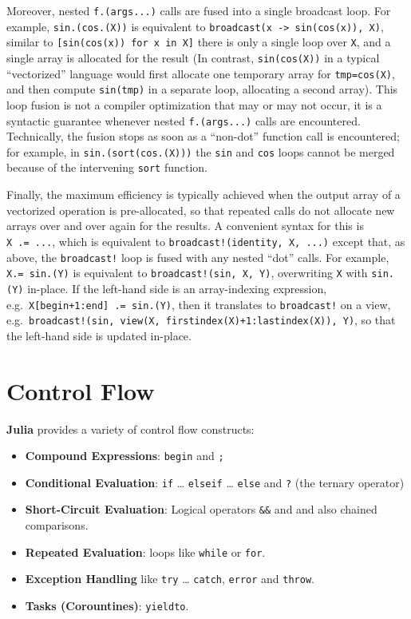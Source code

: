 \documentclass[
]{article}
\providecommand{\tightlist}{%
  \setlength{\itemsep}{0pt}\setlength{\parskip}{0pt}}
\begin{document}
Moreover, nested \texttt{f.(args...)} calls are fused into a single
broadcast loop. For example, \texttt{sin.(cos.(X))} is equivalent to
\texttt{broadcast(x\ -\textgreater{}\ sin(cos(x)),\ X)}, similar to
\texttt{{[}sin(cos(x))\ for\ x\ in\ X{]}} there is only a single loop
over \texttt{X}, and a single array is allocated for the result (In
contrast, \texttt{sin(cos(X))} in a typical ``vectorized'' language
would first allocate one temporary array for \texttt{tmp=cos(X)}, and
then compute \texttt{sin(tmp)} in a separate loop, allocating a second
array). This loop fusion is not a compiler optimization that may or may
not occur, it is a syntactic guarantee whenever nested
\texttt{f.(args...)} calls are encountered. Technically, the fusion
stops as soon as a ``non-dot'' function call is encountered; for
example, in \texttt{sin.(sort(cos.(X)))} the \texttt{sin} and
\texttt{cos} loops cannot be merged because of the intervening
\texttt{sort} function.

Finally, the maximum efficiency is typically achieved when the output
array of a vectorized operation is pre-allocated, so that repeated calls
do not allocate new arrays over and over again for the results. A
convenient syntax for this is \texttt{X\ .=\ ...}, which is equivalent
to \texttt{broadcast!(identity,\ X,\ ...)} except that, as above, the
\texttt{broadcast!} loop is fused with any nested ``dot'' calls. For
example, \texttt{X.=\ sin.(Y)} is equivalent to
\texttt{broadcast!(sin,\ X,\ Y)}, overwriting \texttt{X} with
\texttt{sin.(Y)} in-place. If the left-hand side is an array-indexing
expression, e.g.~\texttt{X{[}begin+1:end{]}\ .=\ sin.(Y)}, then it
translates to \texttt{broadcast!} on a view,
e.g.~\texttt{broadcast!(sin,\ view(X,\ firstindex(X)+1:lastindex(X)),\ Y)},
so that the left-hand side is updated in-place.

\newpage

\hypertarget{control-flow}{%
\section{Control Flow}\label{control-flow}}

\textbf{Julia} provides a variety of control flow constructs:

\begin{itemize}
\tightlist
\item
  \textbf{Compound Expressions}: \texttt{begin} and \texttt{;}
\item
  \textbf{Conditional Evaluation}: \texttt{if} \ldots{} \texttt{elseif}
  \ldots{} \texttt{else} and \texttt{?} (the ternary operator)
\item
  \textbf{Short-Circuit Evaluation}: Logical operators \texttt{\&\&} and
  \texttt{\textbar{}\textbar{}} and also chained comparisons.
\item
  \textbf{Repeated Evaluation}: loops like \texttt{while} or
  \texttt{for}.
\item
  \textbf{Exception Handling} like \texttt{try} \ldots{} \texttt{catch},
  \texttt{error} and \texttt{throw}.
\item
  \textbf{Tasks (Corountines)}: \texttt{yieldto}.
\end{itemize}
\end{document}
